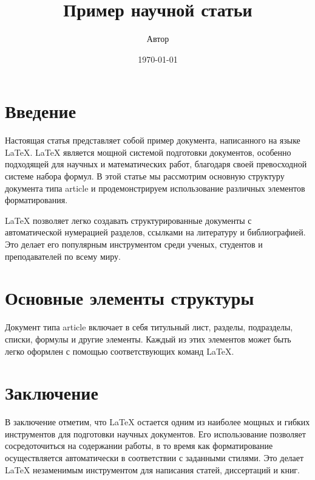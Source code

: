\documentclass{article}
\title{Пример научной статьи}
\author{Автор}
\date{\today}
\begin{document}
\maketitle

\section{Введение}
Настоящая статья представляет собой пример документа, написанного на языке LaTeX. 
LaTeX является мощной системой подготовки документов, особенно подходящей для научных и математических работ, 
благодаря своей превосходной системе набора формул. В этой статье мы рассмотрим основную структуру документа 
типа article и продемонстрируем использование различных элементов форматирования.

LaTeX позволяет легко создавать структурированные документы с автоматической нумерацией разделов, 
ссылками на литературу и библиографией. Это делает его популярным инструментом среди ученых, 
студентов и преподавателей по всему миру.

\section{Основные элементы структуры}
Документ типа article включает в себя титульный лист, разделы, подразделы, списки, формулы и другие элементы. 
Каждый из этих элементов может быть легко оформлен с помощью соответствующих команд LaTeX.

\section{Заключение}
В заключение отметим, что LaTeX остается одним из наиболее мощных и гибких инструментов для подготовки 
научных документов. Его использование позволяет сосредоточиться на содержании работы, 
в то время как форматирование осуществляется автоматически в соответствии с заданными стилями. 
Это делает LaTeX незаменимым инструментом для написания статей, диссертаций и книг.
\end{document}
